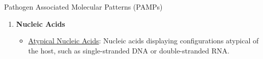 \begin{core}[label=core:pamp]{Pathogen Associated Molecular Patterns (PAMPs)}
\begin{enumerate}
          \begin{itemize}

            \item \ul{Lipopolysaccharide (LPS)}: Innately recognized lipids that are typically conjugated to carbohydrates or peptides, exemplified by the outer membrane component of Gram-negative bacteria (\textit{\autoref{fig:peptidoglycan}}).

          \end{itemize}

        \item \textbf{Nucleic Acids}

          \begin{itemize}

            \item \ul{Atypical Nucleic Acids}: Nucleic acids displaying configurations atypical of the host, such as single-stranded DNA or double-stranded RNA.

          \end{itemize}

      \end{enumerate}

    \end{core}


